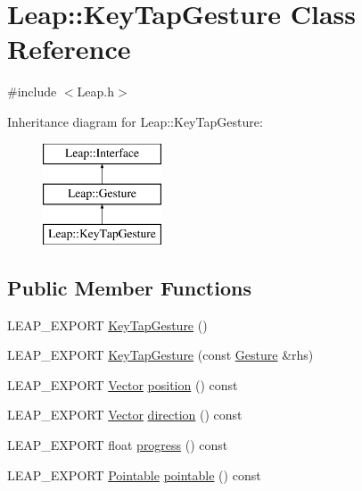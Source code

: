 \hypertarget{class_leap_1_1_key_tap_gesture}{\section{Leap\+:\+:Key\+Tap\+Gesture Class Reference}
\label{class_leap_1_1_key_tap_gesture}
}


{\ttfamily \#include $<$Leap.\+h$>$}

Inheritance diagram for Leap\+:\+:Key\+Tap\+Gesture\+:\begin{figure}[H]
\begin{center}
\leavevmode
\includegraphics[height=3.000000cm]{class_leap_1_1_key_tap_gesture}
\end{center}
\end{figure}
\subsection*{Public Member Functions}
\begin{DoxyCompactItemize}
\item 
L\+E\+A\+P\+\_\+\+E\+X\+P\+O\+R\+T \hyperlink{class_leap_1_1_key_tap_gesture_a916eb2060586a29c499b0201cef9b203}{Key\+Tap\+Gesture} ()
\item 
L\+E\+A\+P\+\_\+\+E\+X\+P\+O\+R\+T \hyperlink{class_leap_1_1_key_tap_gesture_a701172268caa05b6c05bf3cd8578bde5}{Key\+Tap\+Gesture} (const \hyperlink{class_leap_1_1_gesture}{Gesture} \&rhs)
\item 
L\+E\+A\+P\+\_\+\+E\+X\+P\+O\+R\+T \hyperlink{struct_leap_1_1_vector}{Vector} \hyperlink{class_leap_1_1_key_tap_gesture_a2f9de1992ab50eeaa0cbfaa0499420bd}{position} () const 
\item 
L\+E\+A\+P\+\_\+\+E\+X\+P\+O\+R\+T \hyperlink{struct_leap_1_1_vector}{Vector} \hyperlink{class_leap_1_1_key_tap_gesture_ab8bad7448409ee1f69548a3351303125}{direction} () const 
\item 
L\+E\+A\+P\+\_\+\+E\+X\+P\+O\+R\+T float \hyperlink{class_leap_1_1_key_tap_gesture_a1bd7863f9c3b70b8312cf0946bbb1569}{progress} () const 
\item 
L\+E\+A\+P\+\_\+\+E\+X\+P\+O\+R\+T \hyperlink{class_leap_1_1_pointable}{Pointable} \hyperlink{class_leap_1_1_key_tap_gesture_a2f1392201385cb36a84e6a3ff4152305}{pointable} () const 
\end{DoxyCompactItemize}
